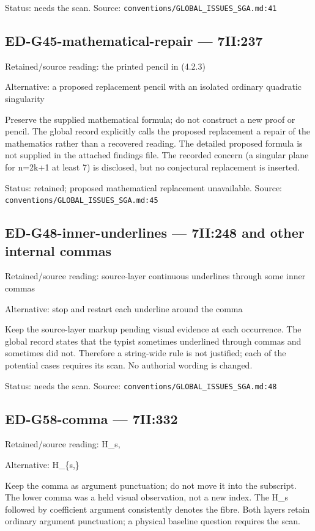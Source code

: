 Status: needs the scan. Source: \nolinkurl{conventions/GLOBAL_ISSUES_SGA.md:41}

\subsection*{ED-G45-mathematical-repair — 7II:237}

Retained/source reading: the printed pencil in (4.2.3)

Alternative: a proposed replacement pencil with an isolated ordinary quadratic singularity

Preserve the supplied mathematical formula; do not construct a new proof or pencil. The global record explicitly calls the proposed replacement a repair of the mathematics rather than a recovered reading. The detailed proposed formula is not supplied in the attached findings file. The recorded concern (a singular plane for n=2k+1 at least 7) is disclosed, but no conjectural replacement is inserted.

Status: retained; proposed mathematical replacement unavailable. Source: \nolinkurl{conventions/GLOBAL_ISSUES_SGA.md:45}

\subsection*{ED-G48-inner-underlines — 7II:248 and other internal commas}

Retained/source reading: source-layer continuous underlines through some inner commas

Alternative: stop and restart each underline around the comma

Keep the source-layer markup pending visual evidence at each occurrence. The global record states that the typist sometimes underlined through commas and sometimes did not. Therefore a string-wide rule is not justified; each of the potential cases requires its scan. No authorial wording is changed.

Status: needs the scan. Source: \nolinkurl{conventions/GLOBAL_ISSUES_SGA.md:48}

\subsection*{ED-G58-comma — 7II:332}

Retained/source reading: H\_s,

Alternative: H\_\{s,\}

Keep the comma as argument punctuation; do not move it into the subscript. The lower comma was a held visual observation, not a new index. The H\_s followed by coefficient argument consistently denotes the fibre. Both layers retain ordinary argument punctuation; a physical baseline question requires the scan.

